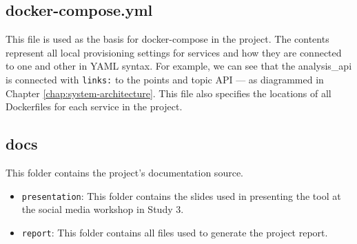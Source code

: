 \subsection*{docker-compose.yml}
  This file is used as the basis for docker-compose in the project. The contents represent all local provisioning settings for services and how they are connected to one and other in YAML syntax. For example, we can see that the analysis\_api is connected with \texttt{links:} to the points and topic API --- as diagrammed in Chapter \ref{chap:system-architecture}. This file also specifies the locations of all Dockerfiles for each service in the project.

\subsection*{docs}
  This folder contains the project's documentation source.
  \begin{itemize}
    \item
      \texttt{presentation}: This folder contains the slides used in presenting the tool at the social media workshop in Study 3.
    \item
      \texttt{report}: This folder contains all files used to generate the project report.
  \end{itemize}

